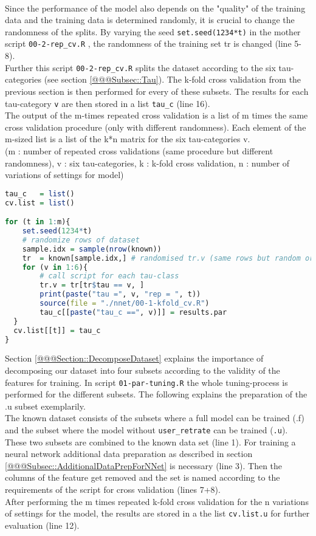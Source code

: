 \documentclass[10pt,a4paper]{article}
\begin{document}
\\
Since the performance of the model also depends on the "quality" of the training data and the training data is determined randomly, it is crucial to change the randomness of the splits. By varying the seed \texttt{set.seed(1234*t)} in the mother script  \texttt{00-2-rep\_cv.R} , the randomness of the training set tr is changed (line 5-8). \\ 
Further this script \texttt{00-2-rep\_cv.R} splits the dataset according to the six tau-categories (see section \ref{@@@Subsec::Tau}). The k-fold cross validation from the previous section is then performed for every of these subsets. The results for each tau-category \texttt{v} are then stored in a list \texttt{tau\_c} (line 16). \\
The output of the m-times repeated cross validation is a list of m times the same cross validation procedure (only with different randomness). Each element of the m-sized list is a list of the k*n matrix for the six tau-categories v.\\
(m : number of repeated cross validations (same procedure but different randomness), v : six tau-categories, k : k-fold cross validation, n : number of variations of settings for model)

\begin{lstlisting}[language=r]
tau_c   = list()
cv.list = list()

for (t in 1:m){
    set.seed(1234*t)
    # randomize rows of dataset
    sample.idx = sample(nrow(known))
    tr  = known[sample.idx,] # randomised tr.v (same rows but random order)
    for (v in 1:6){
        # call script for each tau-class
        tr.v = tr[tr$tau == v, ]
        print(paste("tau =", v, "rep = ", t))
        source(file = "./nnet/00-1-kfold_cv.R")
        tau_c[[paste("tau_c ==", v)]] = results.par
  }
  cv.list[[t]] = tau_c
}

\end{lstlisting}



Section \ref{@@@Section::DecomposeDataset} explains the importance of decomposing our dataset into four subsets according to the validity of the features for training. In script \texttt{01-par-tuning.R} the whole tuning-process is performed for the different subsets. The following explains the preparation of the .u subset exemplarily.\\
The known dataset consists of the subsets where a full model can be trained (.f) and the subset where the model without \texttt{user\_retrate} can be trained (\texttt{.u}). These two subsets are combined to the known data set (line 1). For training a neural network additional data preparation as described in section \ref{@@@Subsec::AdditionalDataPrepForNNet} is necessary (line 3). Then the columns of the feature  get removed and the set is named according to the requirements of the script for cross validation (lines 7+8). \\
After performing the m times repeated k-fold cross validation for the n variations of settings for the model, the results are stored in a the list \texttt{cv.list.u} for further evaluation (line 12).
\end{document}
